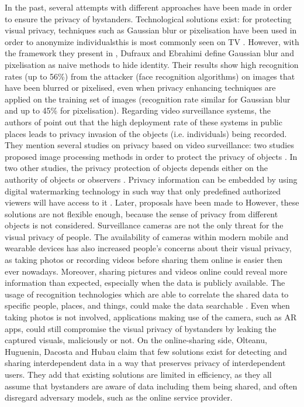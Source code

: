 \documentclass[conference, 11pt]{IEEEtran}
\begin{document}
In the past, several attempts with different approaches have been made in order to ensure the privacy of bystanders. Technological solutions exist: for protecting visual privacy, techniques such as Gaussian blur or pixelisation have been used in order to anonymize individuals\textemdash this is most commonly seen on TV \cite{dufaux2010framework}. However, with the framework they present in \cite{dufaux2010framework}, Dufraux and Ebrahimi define Gaussian blur and pixelisation as naive methods to hide identity. Their results show high recognition rates (up to 56\%) from the attacker (face recognition algorithms) on images that have been blurred or pixelised, even when privacy enhancing techniques are applied on the training set of images (recognition rate similar for Gaussian blur and up to 45\% for pixelisation). 
Regarding video surveillance systems, the authors of \cite{chinomi2008PriSurv} point out that the high deployment rate of these systems in public places leads to privacy invasion of the objects (i.e. individuals) being recorded. They mention several studies on privacy based on video surveillance: two studies proposed image processing methods in order to protect the privacy of objects \cite{cavallaro2005, kitahara2004}. In two other studies, the privacy protection of objects depends either on the authority of objects or observers \cite{jehan2005, senior2005}. Privacy information can be embedded by using digital watermarking technology in such way that only predefined authorized viewers will have access to it \cite{zhang2005}. Later, proposals have been made to However, these solutions are not flexible enough, because the sense of privacy from different objects is not considered.
Surveillance cameras are not the only threat for the visual privacy of people. The availability of cameras within modern mobile and wearable devices has also increased people's concerns about their visual privacy, as taking photos or recording videos before sharing them online is easier then ever nowadays. Moreover, sharing pictures and videos online could reveal more information than expected, especially when the data is publicly available. The usage of recognition technologies which are able to correlate the shared data to specific people, places, and things, could make the data searchable \cite{gross2014, shaw2006}. Even when taking photos is not involved, applications making use of the camera, such as \ac{AR} apps, could still compromise the visual privacy of bystanders by leaking the captured visuals, maliciously or not.  
On the online-sharing side, Olteanu, Huguenin, Dacosta and Hubau \cite{olteanu2018consensual} claim that few solutions exist for detecting and sharing interdependent data in a way that preserves privacy of interdependent users. They add that existing solutions are limited in efficiency, as they all assume that bystanders are aware of data including them being shared, and often disregard adversary models, such as the online service provider. 
\end{document}
